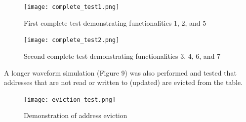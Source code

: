 \documentclass{article}
\begin{document}
\begin{figure}[ht!]
  \centering
  	\texttt{[image: complete\_test1.png]}
  \caption{First complete test demonstrating functionalities 1, 2, and 5}
  \label{fig:complete-test1}
\end{figure}

\begin{figure}[ht!]
  \centering
  	\texttt{[image: complete\_test2.png]}
  \caption{Second complete test demonstrating functionalities 3, 4, 6, and 7}
  \label{fig:complete-test2}
\end{figure}

\newpage

A longer waveform simulation (Figure 9) was also performed and tested that addresses that are not read or written to (updated) are evicted from the table.

\begin{figure}[ht!]
  \centering
  	\texttt{[image: eviction\_test.png]}
  \caption{Demonstration of address eviction}
  \label{fig:eviction-test}
\end{figure}
\end{document}
